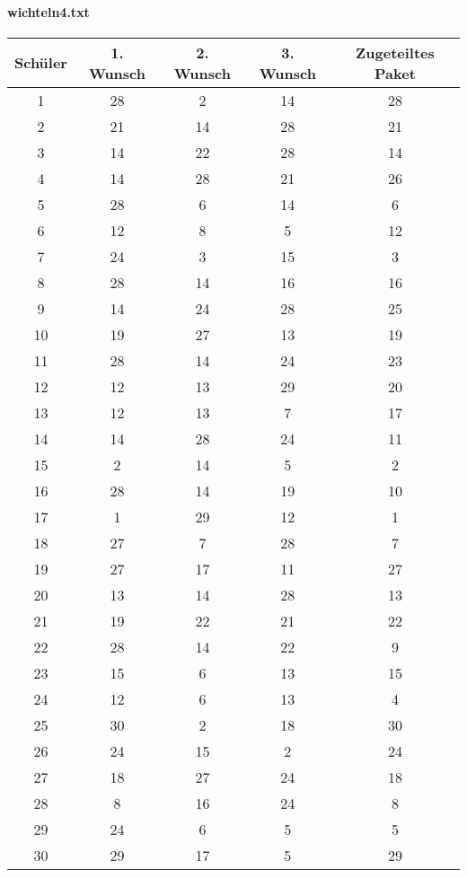 \documentclass[a4paper,10pt,ngerman]{scrartcl}
\begin{document}
\paragraph{wichteln4.txt}
\begin{longtable}[c]{c|c|c|c|c}
    Schüler & 1. Wunsch & 2. Wunsch & 3. Wunsch & Zugeteiltes Paket \\
    \hline
    \endhead
    1 & 28 & 2 & 14 & 28 \\
    2 & 21 & 14 & 28 & 21 \\
    3 & 14 & 22 & 28 & 14 \\
    4 & 14 & 28 & 21 & 26 \\
    5 & 28 & 6 & 14 & 6 \\
    6 & 12 & 8 & 5 & 12 \\
    7 & 24 & 3 & 15 & 3 \\
    8 & 28 & 14 & 16 & 16 \\
    9 & 14 & 24 & 28 & 25 \\
    10 & 19 & 27 & 13 & 19 \\
    11 & 28 & 14 & 24 & 23 \\
    12 & 12 & 13 & 29 & 20 \\
    13 & 12 & 13 & 7 & 17 \\
    14 & 14 & 28 & 24 & 11 \\
    15 & 2 & 14 & 5 & 2 \\
    16 & 28 & 14 & 19 & 10 \\
    17 & 1 & 29 & 12 & 1 \\
    18 & 27 & 7 & 28 & 7 \\
    19 & 27 & 17 & 11 & 27 \\
    20 & 13 & 14 & 28 & 13 \\
    21 & 19 & 22 & 21 & 22 \\
    22 & 28 & 14 & 22 & 9 \\
    23 & 15 & 6 & 13 & 15 \\
    24 & 12 & 6 & 13 & 4 \\
    25 & 30 & 2 & 18 & 30 \\
    26 & 24 & 15 & 2 & 24 \\
    27 & 18 & 27 & 24 & 18 \\
    28 & 8 & 16 & 24 & 8 \\
    29 & 24 & 6 & 5 & 5 \\
    30 & 29 & 17 & 5 & 29
\end{longtable}
\end{document}
